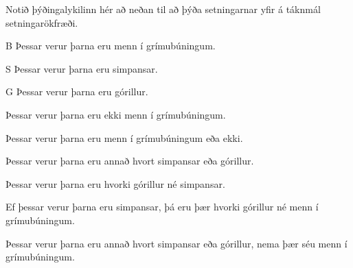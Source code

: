 \practiceproblems
\problempart Notið þýðingalykilinn hér að neðan til að þýða setningarnar yfir á táknmál setningarökfræði.\label{pr.monkeysuits}
	\begin{ekey}
		\item[B] Þessar verur þarna eru menn í grímubúningum. 
		\item[S] Þessar verur þarna eru simpansar. 
		\item[G] Þessar verur þarna eru górillur.
	\end{ekey}
\begin{earg}
\item Þessar verur þarna eru ekki menn í grímubúningum.
\item Þessar verur þarna eru menn í grímubúningum eða ekki.
\item Þessar verur þarna eru annað hvort simpansar eða górillur.
\item Þessar verur þarna eru hvorki górillur né simpansar.
\item Ef þessar verur þarna eru simpansar, þá eru þær hvorki górillur né menn í grímubúningum.
\item Þessar verur þarna eru annað hvort simpansar eða górillur, nema þær séu menn í grímubúningum.
\end{earg}

